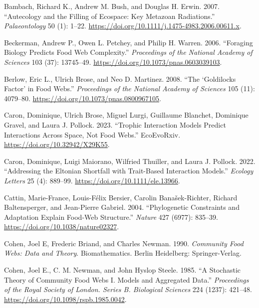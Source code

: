 \documentclass[
  letterpaper,
  DIV=11,
  numbers=noendperiod]{scrartcl}
\newlength{\cslhangindent}
\newenvironment{CSLReferences}[2] %
 {\begin{list}{}{%
  \setlength{\itemindent}{0pt}
  \setlength{\leftmargin}{0pt}
  \setlength{\parsep}{0pt}
  \ifodd #1
   \setlength{\leftmargin}{\cslhangindent}
   \setlength{\itemindent}{-1\cslhangindent}
  \fi
  \setlength{\itemsep}{#2\baselineskip}}}
 {\end{list}}
\begin{document}
\label{refs}
\begin{CSLReferences}{1}{0}
Bambach, Richard K., Andrew M. Bush, and Douglas H. Erwin. 2007.
{``Autecology and the {Filling} of {Ecospace}: {Key Metazoan
Radiations}.''} \emph{Palaeontology} 50 (1): 1--22.
\url{https://doi.org/10.1111/j.1475-4983.2006.00611.x}.

Beckerman, Andrew P., Owen L. Petchey, and Philip H. Warren. 2006.
{``Foraging Biology Predicts Food Web Complexity.''} \emph{Proceedings
of the National Academy of Sciences} 103 (37): 13745--49.
\url{https://doi.org/10.1073/pnas.0603039103}.

Berlow, Eric L., Ulrich Brose, and Neo D. Martinez. 2008. {``The
{`{Goldilocks} Factor'} in Food Webs.''} \emph{Proceedings of the
National Academy of Sciences} 105 (11): 4079--80.
\url{https://doi.org/10.1073/pnas.0800967105}.

Caron, Dominique, Ulrich Brose, Miguel Lurgi, Guillaume Blanchet,
Dominique Gravel, and Laura J. Pollock. 2023. {``Trophic Interaction
Models Predict Interactions Across Space, Not Food Webs.''} EcoEvoRxiv.
\url{https://doi.org/10.32942/X29K55}.

Caron, Dominique, Luigi Maiorano, Wilfried Thuiller, and Laura J.
Pollock. 2022. {``Addressing the {Eltonian} Shortfall with Trait-Based
Interaction Models.''} \emph{Ecology Letters} 25 (4): 889--99.
\url{https://doi.org/10.1111/ele.13966}.

Cattin, Marie-France, Louis-Félix Bersier, Carolin Banašek-Richter,
Richard Baltensperger, and Jean-Pierre Gabriel. 2004. {``Phylogenetic
Constraints and Adaptation Explain Food-Web Structure.''} \emph{Nature}
427 (6977): 835--39. \url{https://doi.org/10.1038/nature02327}.

Cohen, Joel E, Frederic Briand, and Charles Newman. 1990.
\emph{Community {Food Webs}: {Data} and {Theory}}. Biomathematics.
Berlin Heidelberg: Springer-Verlag.

Cohen, Joel E., C. M. Newman, and John Hyslop Steele. 1985. {``A
Stochastic Theory of Community Food Webs {I}. {Models} and Aggregated
Data.''} \emph{Proceedings of the Royal Society of London. Series B.
Biological Sciences} 224 (1237): 421--48.
\url{https://doi.org/10.1098/rspb.1985.0042}.


\end{CSLReferences}
\end{document}
